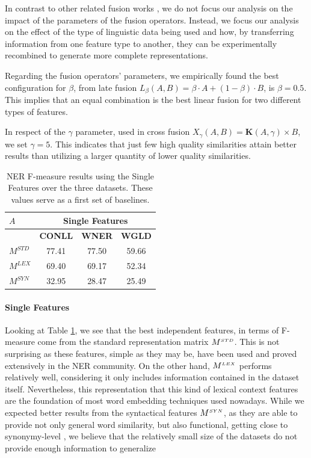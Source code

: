 In contrast to other related fusion works \cite{Ah-PineCC15,ClinchantAC11,GialampoukidisM16}, we do not focus our analysis on the impact of the parameters of the fusion operators. Instead, we focus our analysis on the effect of the type of linguistic data being used and how, by transferring information from one feature type to another, they can be experimentally recombined to generate more complete representations.

Regarding the fusion operators' parameters, we empirically found the best configuration for $\beta$, from late fusion $L_\beta(A,B) = \beta \cdot A + (1 - \beta)\cdot B$, is $\beta=0.5$. This implies that an equal combination is the best linear fusion for two different types of features.

In respect of the $\gamma$ parameter, used in cross fusion $X_{\gamma}(A,B) = \mathbf{K}(A,\gamma) \times B$, we set $\gamma=5$. This indicates that just few high quality similarities attain better results than utilizing a larger quantity of lower quality similarities.

\begin{table}[!tbp]
\centering
\caption{NER F-measure results using the Single Features over the three datasets. These values serve as a first set of baselines. }
\label{tab:ner-blines}
\begin{tabular}{@{}lccc@{}}
\toprule
$A$                           & \multicolumn{3}{c}{\textbf{Single Features}} \\ \midrule
                & \textbf{CONLL}    & \textbf{WNER}     & \textbf{WGLD}    \\ \cmidrule{2-4}
$M^{\scriptscriptstyle STD}$                        & 77.41    & 77.50    & 59.66   \\
$M^{\scriptscriptstyle LEX}$                       & 69.40    & 69.17    & 52.34   \\
$M^{\scriptscriptstyle SYN}$                        & 32.95    & 28.47    & 25.49   \\ \bottomrule
\end{tabular}

\end{table}
\paragraph{Single Features}
Looking at Table \ref{tab:ner-blines}, we see that the best independent features, in terms of F-measure come from the standard representation matrix $M^{\scriptscriptstyle STD}$. This is not surprising as these features, simple as they may be, have been used and proved extensively in the NER community. On the other hand, $M^{\scriptscriptstyle LEX}$ performs relatively well, considering it only includes information contained in the dataset itself. Nevertheless, this representation that this kind of lexical context features are the foundation of most word embedding techniques used nowadays.
While we expected better results from the syntactical features $M^{\scriptscriptstyle SYN}$, as they are able to provide not only general word similarity, but also functional, getting close to synonymy-level \cite{LevyG14},  we believe that the relatively small size of the datasets do not provide enough information to generalize 
